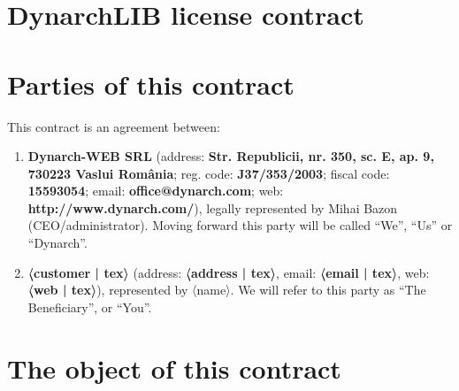 \documentclass[a4paper,10pt]{article}
\begin{document}
\section*{DynarchLIB license contract}

\section{Parties of this contract}

This contract is an agreement between:

\begin{enumerate}

  \item \textbf{Dynarch-WEB SRL} (address: \textbf{Str. Republicii, nr. 350,
    sc. E, ap. 9, 730223 Vaslui România}; reg. code: \textbf{J37/353/2003};
    fiscal code: \textbf{15593054}; email: \textbf{office@dynarch.com}; web:
    \textbf{http://www.dynarch.com/}), legally represented by Mihai Bazon
    (CEO/administrator).  Moving forward this party will be called “We”, “Us”
    or “Dynarch”.

  \item \textbf{〈customer | tex〉} (address: \textbf{〈address | tex〉}, email:
    \textbf{〈email | tex〉}, web: \textbf{〈web | tex〉}), represented by 〈name〉.
    We will refer to this party as “The Beneficiary”, or “You”.

\end{enumerate}

\section{The object of this contract}
\end{document}
